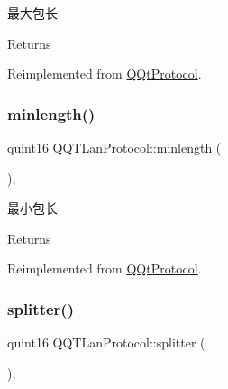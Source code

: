 最大包长 

\begin{DoxyReturn}{Returns}

\end{DoxyReturn}


Reimplemented from \mbox{\hyperlink{class_q_qt_protocol_af41bc3116abbbcfc9af45e151a253ff7}{Q\+Qt\+Protocol}}.

\mbox{\label{class_q_q_t_lan_protocol_aa554a0956cf9790958b6959211d8cea3}} 
\subsubsection{\texorpdfstring{minlength()}{minlength()}}
{\footnotesize\ttfamily quint16 Q\+Q\+T\+Lan\+Protocol\+::minlength (\begin{DoxyParamCaption}{ }\end{DoxyParamCaption})\hspace{0.3cm}{\ttfamily [override]}, {\ttfamily [virtual]}}



最小包长 

\begin{DoxyReturn}{Returns}

\end{DoxyReturn}


Reimplemented from \mbox{\hyperlink{class_q_qt_protocol_a2b00f53d3dd0eed817eeecff422891f3}{Q\+Qt\+Protocol}}.

\mbox{\label{class_q_q_t_lan_protocol_ad7cfd8f888490a3453f7868cc38d914b}} 
\subsubsection{\texorpdfstring{splitter()}{splitter()}}
{\footnotesize\ttfamily quint16 Q\+Q\+T\+Lan\+Protocol\+::splitter (\begin{DoxyParamCaption}\item[{const Q\+Byte\+Array \&}]{ }\end{DoxyParamCaption})\hspace{0.3cm}{\ttfamily [override]}, {\ttfamily [virtual]}}



